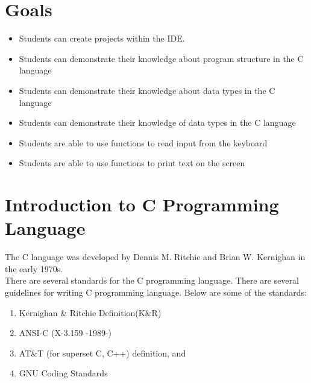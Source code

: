 \section{Goals}
\begin{itemize}[label=$\bullet$, itemsep=-1pt, leftmargin=*]
	\item Students can create projects within the IDE.
	\item Students can demonstrate their knowledge about program structure in the C language
	\item Students can demonstrate their knowledge about data types in the C language
	\item Students can demonstrate their knowledge of data types in the C language
    \item Students are able to use functions to read input from the keyboard
    \item Students are able to use functions to print text on the screen

\end{itemize}
\section{Introduction to C Programming Language}

The C language was developed by Dennis M. Ritchie and Brian W. Kernighan in the early 1970s.\\
There are several standards for the C programming language. There are several guidelines for writing C programming language. Below are some of the standards:
\begin{enumerate}
	\item Kernighan \& Ritchie Definition(K\&R)
    \item ANSI-C (X-3.159 -1989-)
    \item AT\&T (for superset C, C++) definition, and
    \item GNU Coding Standards
\end{enumerate}
